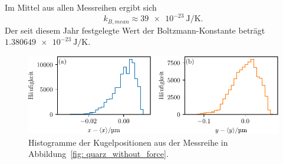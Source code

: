 Im Mittel aus allen Messreihen ergibt sich
\begin{equation}
  k_{B, mean} \approx \SI{39e-23}{\joule\per\kelvin}.
\end{equation}
Der seit diesem Jahr festgelegte Wert der Boltzmann-Konstante beträgt $\SI{1.380649e-23}{\joule\per\kelvin}$.
\begin{figure}
  \centering
  \includegraphics[scale = 1 ]{../analysis/data/i_quarz/70mA/results/without_force_histogram_70mA.pdf}
  \caption{Histogramme der Kugelpositionen aus der Messreihe in Abbildung~\ref{fig: quarz_without_force}.}
  \label{fig: quarz_without_force_hist}
\end{figure}

